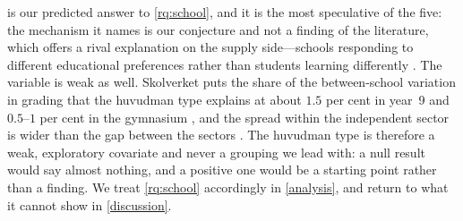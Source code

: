  is our predicted answer to \cref{rq:school}, and it is the
most speculative of the five: the mechanism it names is our conjecture and
not a finding of the literature, which offers a rival explanation on the
supply side---schools responding to different educational preferences
rather than students learning differently
\autocite[pp.~40--41]{HinnerichVlachos2017}.
The variable is weak as well.
Skolverket puts the share of the between-school variation in grading that
the huvudman type explains at about \(1.5\) per cent in year~9
\autocite[p.~30]{Skolverket2019Betyg} and \(0.5\)--\(1\) per cent in the
gymnasium \autocite[p.~46]{Skolverket2020Betyg}, and the spread within the
independent sector is wider than the gap between the sectors
\autocite[p.~26]{Skolverket2019Betyg}.
The huvudman type is therefore a weak, exploratory covariate and never a
grouping we lead with: a null result would say almost nothing, and a
positive one would be a starting point rather than a finding.
We treat \cref{rq:school} accordingly in \cref{analysis}, and return to
what it cannot show in \cref{discussion}.
